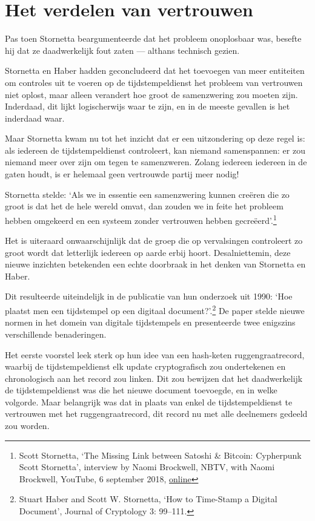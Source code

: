 \documentclass[
  a5paper,
  smalldemyvopaper,11pt,twoside,onecolumn,openright,extrafontsizes]{memoir}
\begin{document}
\section{Het verdelen van vertrouwen}\label{het-verdelen-van-vertrouwen}

Pas toen Stornetta beargumenteerde dat het probleem onoplosbaar was,
besefte hij dat ze daadwerkelijk fout zaten --- althans technisch
gezien.

Stornetta en Haber hadden geconcludeerd dat het toevoegen van meer
entiteiten om controles uit te voeren op de tijdstempeldienst het
probleem van vertrouwen niet oplost, maar alleen verandert hoe groot de
samenzwering zou moeten zijn. Inderdaad, dit lijkt logischerwijs waar te
zijn, en in de meeste gevallen is het inderdaad waar.

Maar Stornetta kwam nu tot het inzicht dat er een uitzondering op deze
regel is: als iedereen de tijdstempeldienst controleert, kan niemand
samenspannen: er zou niemand meer over zijn om tegen te samenzweren.
Zolang iedereen iedereen in de gaten houdt, is er helemaal geen
vertrouwde partij meer nodig!

Stornetta stelde: `Als we in essentie een samenzwering kunnen creëren
die zo groot is dat het de hele wereld omvat, dan zouden we in feite het
probleem hebben omgekeerd en een systeem zonder vertrouwen hebben
gecreëerd'.\footnote{Scott Stornetta, `The Missing Link between Satoshi
  \& Bitcoin: Cypherpunk Scott Stornetta', interview by Naomi Brockwell,
  NBTV, with Naomi Brockwell, YouTube, 6 september 2018,
  \href{https://www.youtube.com/watch?v=fYr-keVOQ18}{online}}

Het is uiteraard onwaarschijnlijk dat de groep die op vervalsingen
controleert zo groot wordt dat letterlijk iedereen op aarde erbij hoort.
Desalniettemin, deze nieuwe inzichten betekenden een echte doorbraak in
het denken van Stornetta en Haber.

Dit resulteerde uiteindelijk in de publicatie van hun onderzoek uit
1990: `Hoe plaatst men een tijdstempel op een digitaal
document?'.\footnote{Stuart Haber and Scott W. Stornetta, `How to
  Time-Stamp a Digital Document', Journal of Cryptology 3: 99--111.} De
paper stelde nieuwe normen in het domein van digitale tijdstempels en
presenteerde twee enigszins verschillende benaderingen.

Het eerste voorstel leek sterk op hun idee van een hash-keten
ruggengraatrecord, waarbij de tijdstempeldienst elk update
cryptografisch zou ondertekenen en chronologisch aan het record zou
linken. Dit zou bewijzen dat het daadwerkelijk de tijdstempeldienst was
die het nieuwe document toevoegde, en in welke volgorde. Maar belangrijk
was dat in plaats van enkel de tijdstempeldienst te vertrouwen met het
ruggengraatrecord, dit record nu met alle deelnemers gedeeld zou worden.
\end{document}
